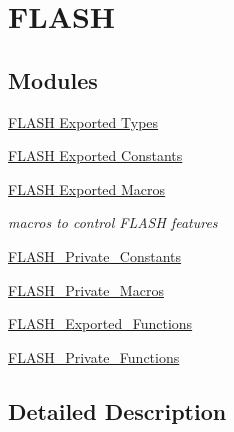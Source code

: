 \hypertarget{group___f_l_a_s_h}{}\section{F\+L\+A\+SH}
\label{group___f_l_a_s_h}
\subsection*{Modules}
\begin{DoxyCompactItemize}
\item 
\hyperlink{group___f_l_a_s_h___exported___types}{F\+L\+A\+S\+H Exported Types}
\item 
\hyperlink{group___f_l_a_s_h___exported___constants}{F\+L\+A\+S\+H Exported Constants}
\item 
\hyperlink{group___f_l_a_s_h___exported___macros}{F\+L\+A\+S\+H Exported Macros}
\begin{DoxyCompactList}\small\item\em macros to control F\+L\+A\+SH features \end{DoxyCompactList}\item 
\hyperlink{group___f_l_a_s_h___private___constants}{F\+L\+A\+S\+H\+\_\+\+Private\+\_\+\+Constants}
\item 
\hyperlink{group___f_l_a_s_h___private___macros}{F\+L\+A\+S\+H\+\_\+\+Private\+\_\+\+Macros}
\item 
\hyperlink{group___f_l_a_s_h___exported___functions}{F\+L\+A\+S\+H\+\_\+\+Exported\+\_\+\+Functions}
\item 
\hyperlink{group___f_l_a_s_h___private___functions}{F\+L\+A\+S\+H\+\_\+\+Private\+\_\+\+Functions}
\end{DoxyCompactItemize}


\subsection{Detailed Description}
